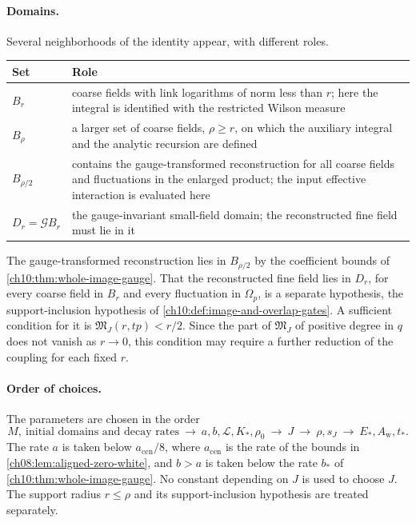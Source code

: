 \paragraph{Domains.}
Several neighborhoods of the identity appear, with different roles.
\begin{center}
\begin{tabular}{@{}l p{}@{}}
\toprule
Set & Role\\
\midrule
$B_r$ & coarse fields with link logarithms of norm less than $r$; here the integral is identified with the restricted Wilson measure\\
$B_\rho$ & a larger set of coarse fields, $\rho\ge r$, on which the auxiliary integral and the analytic recursion are defined\\
$B_{\rho/2}$ & contains the gauge-transformed reconstruction for all coarse fields and fluctuations in the enlarged product; the input effective interaction is evaluated here\\
$D_r=\mathcal G B_r$ & the gauge-invariant small-field domain; the reconstructed fine field must lie in it\\
\bottomrule
\end{tabular}
\end{center}
The gauge-transformed reconstruction lies in $B_{\rho/2}$ by the coefficient bounds of \cref{ch10:thm:whole-image-gauge}. That the reconstructed fine field lies in $D_r$, for every coarse field in $B_r$ and every fluctuation in $\Omega_p$, is a separate hypothesis, the support-inclusion hypothesis of \cref{ch10:def:image-and-overlap-gates}. A sufficient condition for it is $\mathfrak M_J(r,tp)<r/2$. Since the part of $\mathfrak M_J$ of positive degree in $q$ does not vanish as $r\to0$, this condition may require a further reduction of the coupling for each fixed $r$.

\paragraph{Order of choices.}
The parameters are chosen in the order
\[
 M,\ \text{initial domains and decay rates}\ \longrightarrow\ a,b,\mathscr L,K_*,\rho_0\ \longrightarrow\ J\ \longrightarrow\ \rho,s_J\ \longrightarrow\ E_*,A_{\mathrm w},t_*.
\]
The rate $a$ is taken below $a_{\mathrm{cen}}/8$, where $a_{\mathrm{cen}}$ is the rate of the bounds in \cref{ch08:lem:aligned-zero-white}, and $b>a$ is taken below the rate $b_*$ of \cref{ch10:thm:whole-image-gauge}. No constant depending on $J$ is used to choose $J$. The support radius $r\le\rho$ and its support-inclusion hypothesis are treated separately.

